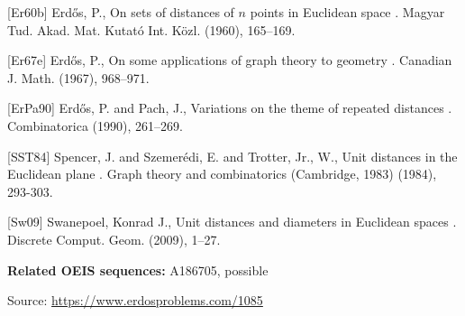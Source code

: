 \documentclass{article}
\begin{document}
[Er60b] Erd\H{o}s, P., On sets of distances of {$n$} points in {E}uclidean space . Magyar Tud. Akad. Mat. Kutat\'o{} Int. K\"ozl. (1960), 165--169.

[Er67e] Erd\H{o}s, P., On some applications of graph theory to geometry . Canadian J. Math. (1967), 968--971.

[ErPa90] Erd\H{o}s, P. and Pach, J., Variations on the theme of repeated distances . Combinatorica (1990), 261--269.

[SST84] Spencer, J. and Szemer\'{e}di, E. and Trotter, Jr., W., Unit distances in the Euclidean plane . Graph theory and combinatorics (Cambridge, 1983) (1984), 293-303.

[Sw09] Swanepoel, Konrad J., Unit distances and diameters in {E}uclidean spaces . Discrete Comput. Geom. (2009), 1--27.

\noindent\textbf{Related OEIS sequences:} A186705, possible


\bigskip
\noindent\small{Source: \url{https://www.erdosproblems.com/1085}}
\end{document}
